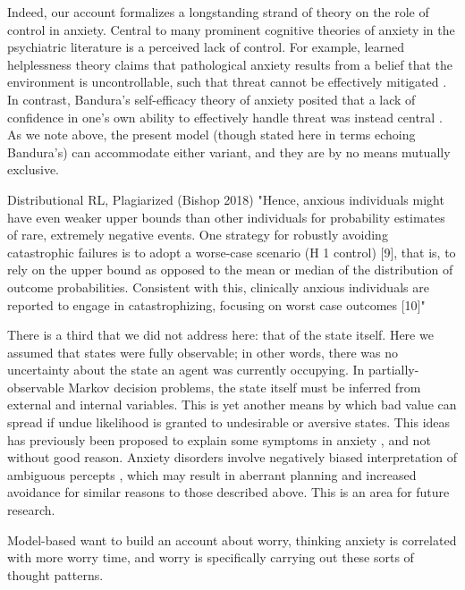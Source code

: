 \documentclass[11pt]{article} %
\begin{document}
Indeed, our account formalizes a longstanding strand of theory on the role of control in anxiety. Central to many prominent cognitive theories of anxiety in the psychiatric literature is a perceived lack of control. For example, learned helplessness theory claims that pathological anxiety results from a belief that the environment is uncontrollable, such that threat cannot be effectively mitigated \cite{alloy1990}. In contrast, Bandura's self-efficacy theory of anxiety posited that a lack of confidence in one's own ability to effectively handle threat was instead central \cite{bandura1977}. As we note above, the present model (though stated here in terms echoing Bandura's) can accommodate either variant, and they are by no means mutually exclusive.

Distributional RL, Plagiarized (Bishop 2018)
"Hence, anxious individuals might have even weaker upper bounds than other individuals for probability estimates of rare, extremely negative events. One strategy for robustly avoiding catastrophic failures is to adopt a worse-case scenario (H 1 control) [9], that is, to rely on the upper bound as opposed to the mean or median of the distribution of outcome probabilities. Consistent with this, clinically anxious individuals are reported to engage in catastrophizing, focusing on worst case outcomes [10]"

There is a third that we did not address here: that of the state itself. Here we assumed that states were fully observable; in other words, there was no uncertainty about the state an agent was currently occupying. In partially-observable Markov decision problems, the state itself must be inferred from external and internal variables. This is yet another means by which bad value can spread if undue likelihood is granted to undesirable or aversive states. This ideas has previously been proposed to explain some symptoms in anxiety \citep{Paulus2012}, and not without good reason. Anxiety disorders involve negatively biased interpretation of ambiguous percepts \citep{Hartley2012}, which may result in aberrant planning and increased avoidance for similar reasons to those described above. This is an area for future research.

Model-based
want to build an account about worry, thinking anxiety is correlated with more worry time, and worry is specifically carrying out these sorts of thought patterns.
\end{document}
